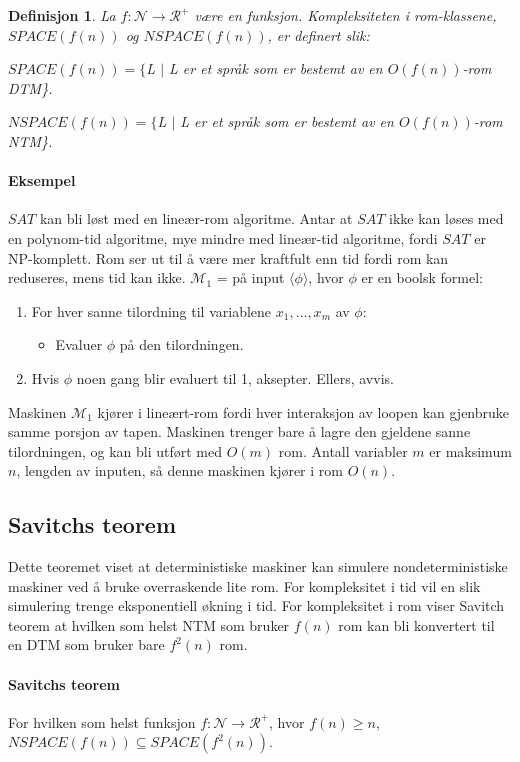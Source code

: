 \documentclass[11pt,a4paper]{article}
\begin{document}
\theoremstyle{mytheoremstyle}
\newtheorem{rom2}{Definisjon}[section]
\begin{rom2}
La $f : \mathcal{N} \rightarrow \mathcal{R}^+$ være en funksjon. Kompleksiteten i rom-klassene, $SPACE (f(n))$ og $NSPACE (f(n))$, er definert slik: 

$SPACE (f(n)) = \{$L $|$ L er et språk som er bestemt av en $O(f(n))$-rom DTM\}.

$NSPACE (f(n)) = \{$L $|$ L er et språk som er bestemt av en $O(f(n))$-rom NTM\}.
\end{rom2}

\paragraph{Eksempel} $SAT$ kan bli løst med en lineær-rom algoritme. Antar at $SAT$ ikke kan løses med en polynom-tid algoritme, mye mindre med lineær-tid algoritme, fordi $SAT$ er NP-komplett. Rom ser ut til å være mer kraftfult enn tid fordi rom kan reduseres, mens tid kan ikke.
\newline
\newline
$\mathcal{M}_1$ = på input $\langle \phi \rangle$, hvor $\phi$ er en boolsk formel:
\begin{enumerate}
\item{For hver sanne tilordning til variablene $x_1, \dots, x_m$} av $\phi$:
\begin{itemize}
\item{Evaluer $\phi$ på den tilordningen.}
\end{itemize}
\item{Hvis $\phi$ noen gang blir evaluert til 1, aksepter. Ellers, avvis.}
\end{enumerate}

Maskinen $\mathcal{M}_1$ kjører i lineært-rom fordi hver interaksjon av loopen kan gjenbruke samme porsjon av tapen. Maskinen trenger bare å lagre den gjeldene sanne tilordningen, og kan bli utført med $O(m)$ rom. Antall variabler $m$ er maksimum $n$, lengden av inputen, så denne maskinen kjører i rom $O(n)$.

\subsection{Savitchs teorem}
Dette teoremet viset at deterministiske maskiner kan simulere nondeterministiske maskiner ved å bruke overraskende lite rom. For kompleksitet i tid vil en slik simulering trenge eksponentiell økning i tid. For kompleksitet i rom viser Savitch teorem at hvilken som helst NTM som bruker $f(n)$ rom kan bli konvertert til en DTM som bruker bare $f^2(n)$ rom.

\paragraph{Savitchs teorem}
For hvilken som helst funksjon $f : \mathcal{N} \rightarrow \mathcal{R}^+$, hvor $f(n) \geq n$, $NSPACE (f(n)) \subseteq SPACE (f^2(n))$.
\end{document}
